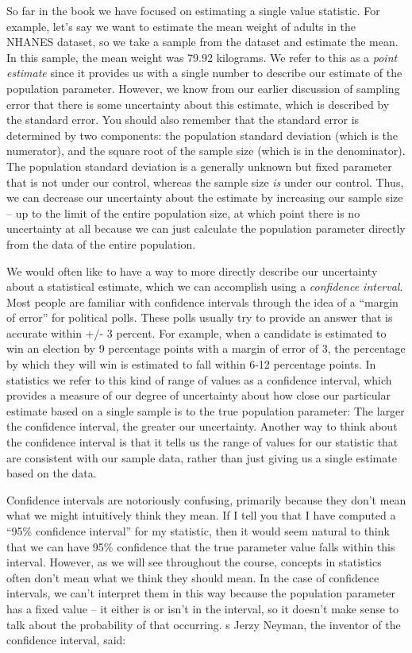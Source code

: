 \documentclass[12pt,]{book}
\theoremstyle{definition}
\theoremstyle{definition}
\theoremstyle{definition}
\theoremstyle{remark}
\begin{document}
So far in the book we have focused on estimating a single value statistic. For example, let's say we want to estimate the mean weight of adults in the NHANES dataset, so we take a sample from the dataset and estimate the mean. In this sample, the mean weight was 79.92 kilograms. We refer to this as a \emph{point estimate} since it provides us with a single number to describe our estimate of the population parameter. However, we know from our earlier discussion of sampling error that there is some uncertainty about this estimate, which is described by the standard error. You should also remember that the standard error is determined by two components: the population standard deviation (which is the numerator), and the square root of the sample size (which is in the denominator). The population standard deviation is a generally unknown but fixed parameter that is not under our control, whereas the sample size \emph{is} under our control. Thus, we can decrease our uncertainty about the estimate by increasing our sample size -- up to the limit of the entire population size, at which point there is no uncertainty at all because we can just calculate the population parameter directly from the data of the entire population.

We would often like to have a way to more directly describe our uncertainty about a statistical estimate, which we can accomplish using a \emph{confidence interval}.\\
Most people are familiar with confidence intervals through the idea of a ``margin of error'' for political polls. These polls usually try to provide an answer that is accurate within +/- 3 percent. For example, when a candidate is estimated to win an election by 9 percentage points with a margin of error of 3, the percentage by which they will win is estimated to fall within 6-12 percentage points. In statistics we refer to this kind of range of values as a confidence interval, which provides a measure of our degree of uncertainty about how close our particular estimate based on a single sample is to the true population parameter: The larger the confidence interval, the greater our uncertainty. Another way to think about the confidence interval is that it tells us the range of values for our statistic that are consistent with our sample data, rather than just giving us a single estimate based on the data.

Confidence intervals are notoriously confusing, primarily because they don't mean what we might intuitively think they mean. If I tell you that I have computed a ``95\% confidence interval'' for my statistic, then it would seem natural to think that we can have 95\% confidence that the true parameter value falls within this interval. However, as we will see throughout the course, concepts in statistics often don't mean what we think they should mean. In the case of confidence intervals, we can't interpret them in this way because the population parameter has a fixed value -- it either is or isn't in the interval, so it doesn't make sense to talk about the probability of that occurring. s Jerzy Neyman, the inventor of the confidence interval, said:
\end{document}
